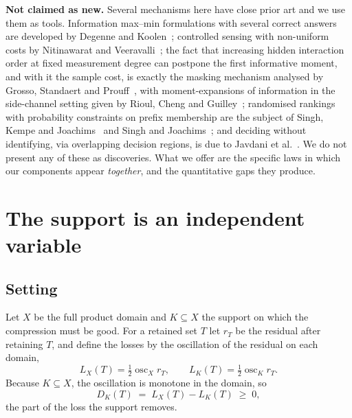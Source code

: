 \textbf{Not claimed as new.} Several mechanisms here have close prior art and we use them
as tools. Information max--min formulations with several correct answers are developed by
Degenne and Koolen~\cite{degenne2019}; controlled sensing with non-uniform costs by
Nitinawarat and Veeravalli~\cite{nitinawarat2013}; the fact that increasing hidden interaction order at fixed measurement degree
can postpone the first informative moment, and with it the sample cost, is exactly the
masking mechanism analysed by Grosso, Standaert and Prouff~\cite{grosso2014}, with
moment-expansions of information in the side-channel setting given by Rioul, Cheng and
Guilley~\cite{rioul2021}; randomised rankings with probability constraints on prefix
membership are the subject of Singh, Kempe and Joachims~\cite{singh2021} and
Singh and Joachims~\cite{singh2018}; and deciding without identifying, via overlapping
decision regions, is due to Javdani et al.~\cite{javdani2014}. We do not present any of
these as discoveries. What we offer are the specific laws in which our components appear
\emph{together}, and the quantitative gaps they produce.


\section{The support is an independent variable}
\label{sec:support}

\subsection{Setting}

Let $X$ be the full product domain and $K\subseteq X$ the support on which the compression
must be good. For a retained set $T$ let $r_{T}$ be the residual after retaining $T$, and
define the losses by the oscillation of the residual on each domain,
\begin{equation}
L_{X}(T)=\tfrac12\operatorname{osc}_{X}r_{T},\qquad
L_{K}(T)=\tfrac12\operatorname{osc}_{K}r_{T}.
\label{eq:twolosses}
\end{equation}
Because $K\subseteq X$, the oscillation is monotone in the domain, so
\begin{equation}
D_{K}(T)\;=\;L_{X}(T)-L_{K}(T)\;\ge\;0 ,
\label{eq:gap}
\end{equation}
the part of the loss the support removes.

